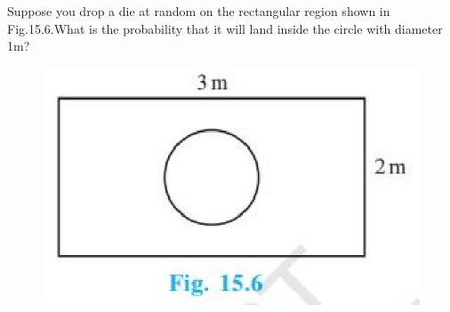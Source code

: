 Suppose you drop a die at random on the rectangular region shown in Fig.15.6.What is the probability that it will land inside the circle with diameter 1m?
\begin{figure}[ht!]
\includegraphics[width=\columnwidth]{./prob/figs/rectangle.eps}
\end{figure}
